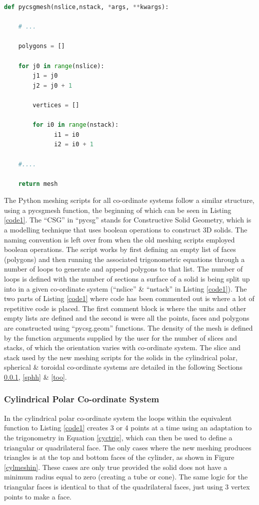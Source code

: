 \documentclass[12pt,a4paper]{article}
\begin{document}
\begin{lstlisting}[language=Python, label=code1, caption=Basic Python function structure for new meshing of primitive solid in Pyg4ometry.]
def pycsgmesh(nslice,nstack, *args, **kwargs):

    # ... 
    
    polygons = []

    for j0 in range(nslice):
        j1 = j0
        j2 = j0 + 1
    
        vertices = []

        for i0 in range(nstack):
              i1 = i0
              i2 = i0 + 1     
              
    #....
    
    return mesh

\end{lstlisting}

\noindent The Python meshing scripts for all co-ordinate systems follow a similar structure, using a pycsgmesh function, the beginning of which can be seen in Listing \ref{code1}. The ``CSG'' in ``pycsg'' stands for Constructive Solid Geometry, which is a modelling technique that uses boolean operations to construct 3D solids. The naming convention is left over from when the old meshing scripts employed boolean operations. The script works by first defining an empty list of faces (polygons) and then running the associated trigonometric equations through a number of loops to generate and append polygons to that list. The number of loops is defined with the number of sections a surface of a solid is being split up into in a given co-ordinate system (``nslice'' \& ``nstack'' in Listing \ref{code1}). The two parts of Listing \ref{code1} where code has been commented out is where a lot of repetitive code is placed. The first comment block is where the units and other empty lists are defined and the second is were all the points, faces and polygons are constructed using ``pycsg.geom'' functions. The density of the mesh is defined by the function arguments supplied by the user for the number of slices and stacks, of which the orientation varies with co-ordinate system. The slice and stack used by the new meshing scripts for the solids in the cylindrical polar, spherical \& toroidal co-ordinate systems are detailed in the following Sections \ref{cycl}, \ref{sphh} \& \ref{too}.

\subsubsection{Cylindrical Polar Co-ordinate System}
\label{cycl}
In the cylindrical polar co-ordinate system the loops within the equivalent function to Listing \ref{code1} creates 3 or 4 points at a time using an adaptation to the trigonometry in Equation \ref{cyctrig}, which can then be used to define a triangular or quadrilateral face. The only cases where the new meshing produces triangles is at the top and bottom faces of the cylinder, as shown in Figure \ref{cylmeshin}. These cases are only true provided the solid does not have a minimum radius equal to zero (creating a tube or cone). The same logic for the triangular faces is identical to that of the quadrilateral faces, just using 3 vertex points to make a face.
\end{document}
